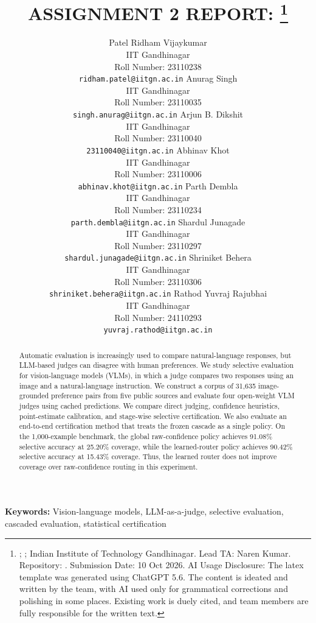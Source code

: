 \documentclass[11pt]{article}
\title{ASSIGNMENT 2 REPORT: \projecttitle
    \thanks{\course; \semester; Indian Institute of Technology Gandhinagar. Lead TA: Naren Kumar. Repository: \repo. Submission Date: 10 Oct 2026. AI Usage Disclosure: {The latex template was generated using ChatGPT 5.6. The content is ideated and written by the team, with AI used only for grammatical corrections and polishing in some places. Existing work is duely cited, and team members are fully responsible for the written text.}}}
\author{
  Patel Ridham Vijaykumar\\
  IIT Gandhinagar\\
  Roll Number: 23110238\\
  \texttt{ridham.patel@iitgn.ac.in}
  \And
  Anurag Singh\\
  IIT Gandhinagar\\
  Roll Number: 23110035\\
  \texttt{singh.anurag@iitgn.ac.in}
  \AND
  Arjun B. Dikshit\\
  IIT Gandhinagar\\
  Roll Number: 23110040\\
  \texttt{23110040@iitgn.ac.in}
  \And
  Abhinav Khot\\
  IIT Gandhinagar\\
  Roll Number: 23110006\\
  \texttt{abhinav.khot@iitgn.ac.in}
  \AND
  Parth Dembla\\
  IIT Gandhinagar\\
  Roll Number: 23110234\\
  \texttt{parth.dembla@iitgn.ac.in}
  \And
  Shardul Junagade\\
  IIT Gandhinagar\\
  Roll Number: 23110297\\
  \texttt{shardul.junagade@iitgn.ac.in}
  \AND
  Shriniket Behera\\
  IIT Gandhinagar\\
  Roll Number: 23110306\\
  \texttt{shriniket.behera@iitgn.ac.in}
  \And
  Rathod Yuvraj Rajubhai\\
  IIT Gandhinagar\\
  Roll Number: 24110293\\
  \texttt{yuvraj.rathod@iitgn.ac.in}
}
\begin{document}
\maketitle

\begin{abstract}

Automatic evaluation is increasingly used to compare natural-language responses, but LLM-based judges can disagree with human preferences. We study selective evaluation for vision-language models (VLMs), in which a judge compares two responses using an image and a natural-language instruction. We construct a corpus of 31,635 image-grounded preference pairs from five public sources and evaluate four open-weight VLM judges using cached predictions. We compare direct judging, confidence heuristics, point-estimate calibration, and stage-wise selective certification. We also evaluate an end-to-end certification method that treats the frozen cascade as a single policy. On the 1,000-example benchmark, the global raw-confidence policy achieves 91.08\% selective accuracy at 25.20\% coverage, while the learned-router policy achieves 90.42\% selective accuracy at 15.43\% coverage. Thus, the learned router does not improve coverage over raw-confidence routing in this experiment.
\end{abstract}

\noindent\textbf{Keywords:} Vision-language models, LLM-as-a-judge, selective evaluation, cascaded evaluation, statistical certification

\end{document}
